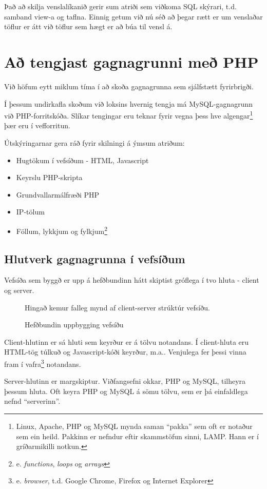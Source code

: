 Það að skilja venslalíkanið gerir sum atriði sem viðkoma SQL skýrari, t.d. samband view-a og taflna. Einnig getum við nú séð að þegar rætt er um venslaðar töflur er átt við töflur sem hægt er að búa til vensl á.


\section{Að tengjast gagnagrunni með PHP}
\label{undirkafli:php}
Við höfum eytt miklum tíma í að skoða gagnagrunna sem sjálfstætt fyrirbrigði.

Í þessum undirkafla skoðum við loksins hvernig tengja má MySQL-gagnagrunn við PHP-forritskóða.
Slíkar tengingar eru teknar fyrir vegna þess hve algengar\footnote{Linux, Apache, PHP og MySQL mynda saman ``pakka'' sem oft er notaður sem ein heild. Pakkinn er nefndur eftir skammstöfun sinni, LAMP. Hann er í gríðarmikilli notkun.} þær eru í vefforritun.

Útskýringarnar gera ráð fyrir skilningi á ýmsum atriðum:
\begin{itemize}
 \item Hugtökum í vefsíðum - HTML, Javascript
 \item Keyrslu PHP-skripta
 \item Grundvallarmálfræði PHP
 \item IP-tölum
 \item Föllum, lykkjum og fylkjum\footnote{e. \emph{functions}, \emph{loops} og \emph{arrays}}
\end{itemize}
\subsection{Hlutverk gagnagrunna í vefsíðum}
Vefsíða sem byggð er upp á hefðbundinn hátt skiptist gróflega í tvo hluta - client og server. 

\begin{figure}
\centering
\caption{Hefðbundin uppbygging vefsíðu}
\label{mynd:uppbyggingvefsidu}
\color{red} Hingað kemur falleg mynd af client-server strúktúr vefsíðu.
\end{figure}

Client-hlutinn er sá hluti sem keyrður er á tölvu notandans. Í client-hluta eru HTML-tög túlkuð og Javascript-kóði keyrður, m.a.. Venjulega fer þessi vinna fram í vafra\footnote{e. \emph{browser}, t.d. Google Chrome, Firefox og Internet Explorer} notandans.

Server-hlutinn er margskiptur. Viðfangsefni okkar, PHP og MySQL, tilheyra þessum hluta. Oft keyra PHP og MySQL á sömu tölvu, sem er þá einfaldlega nefnd ``serverinn''.

